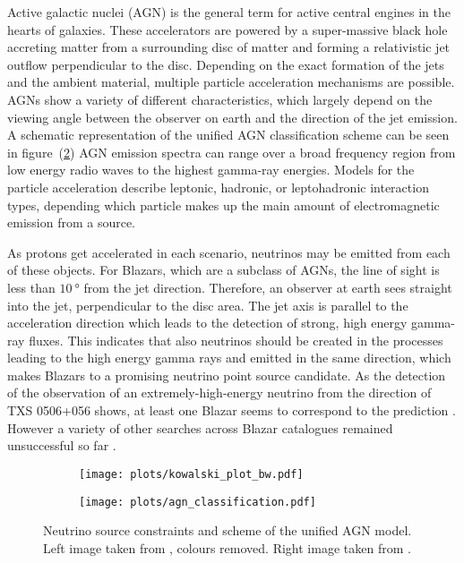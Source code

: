 Active galactic nuclei (AGN) is the general term for active central engines in the hearts of galaxies.
These accelerators are powered by a super-massive black hole accreting matter from a surrounding disc of matter and forming a relativistic jet outflow perpendicular to the disc.
Depending on the exact formation of the jets and the ambient material, multiple particle acceleration mechanisms are possible.
AGNs show a variety of different characteristics, which largely depend on the viewing angle between the observer on earth and the direction of the jet emission.
A schematic representation of the unified AGN classification scheme can be seen in figure~(\ref{fig:astro_agns})
AGN emission spectra can range over a broad frequency region from low energy radio waves to the highest gamma-ray energies.
Models for the particle acceleration describe leptonic, hadronic, or leptohadronic interaction types, depending which particle makes up the main amount of electromagnetic emission from a source.

As protons get accelerated in each scenario, neutrinos may be emitted from each of these objects.
For Blazars, which are a subclass of AGNs, the line of sight is less than $\SI{10}{\degree}$ from the jet direction.
Therefore, an observer at earth sees straight into the jet, perpendicular to the disc area.
The jet axis is parallel to the acceleration direction which leads to the detection of strong, high energy gamma-ray fluxes.
This indicates that also neutrinos should be created in the processes leading to the high energy gamma rays and emitted in the same direction, which makes Blazars to a promising neutrino point source candidate.
As the detection of the observation of an extremely-high-energy neutrino from the direction of TXS 0506+056 shows, at least one Blazar seems to correspond to the prediction \cite{Keivani:2018rnh,Gao:2018mnu}.
However a variety of other searches across Blazar catalogues remained unsuccessful so far \cite{Meagher:2017omt,Huber:2017wxt}.

\begin{figure}[htbp]
  \centering
  \begin{subfigure}[t]{0.49\textwidth}
    \centering
    \texttt{[image: plots/kowalski\_plot\_bw.pdf]}
    \label{fig:astro_kowalski_plot}
  \end{subfigure}
  \hfill
  \begin{subfigure}[t]{0.49\textwidth}
    \centering
    \texttt{[image: plots/agn\_classification.pdf]}
    \label{fig:astro_agns}
  \end{subfigure}
  \caption[Neutrino source constraints and unified AGN model.]{Neutrino source constraints and scheme of the unified AGN model. Left image taken from \cite{Kowalski:2014zda}, colours removed. Right image taken from \cite{Beckmann:2013wte}.}
  \label{fig:agns_and_kowalski}
\end{figure}



